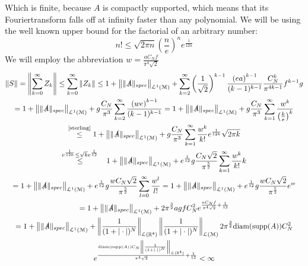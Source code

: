 \documentclass[b5paper,draft,openbib,12pt]{memoir}
\newcommand{\letext}[1]{\ensuremath{\stackrel{\text{#1}}{\le}}}
\begin{document}
Which is finite, because \(A\) is compactly supported, which means that its Fouriertransform falls off at infinity faster than any polynomial.
We will be using the well known upper bound for the factorial of an arbitrary number:
\begin{equation}\label{sterling}
n!\le \sqrt{2\pi n} \left(\frac{n}{e}\right)^n e^\frac{1}{12n}
\end{equation}
We will employ the abbreviation \(w= \frac{ a C_N f}{\pi^4\sqrt{2} }\)
\begin{multline}
\|S\|=\left\|\sum_{k=0}^\infty Z_k \right\|\le \sum_{k=0}^\infty \left\|Z_k \right\| \le 1+ \left\| \|\slashed{A}\|_{spec} \right\|_{\mathcal{L}^1(\mathcal{M})}+ \sum_{k=2}^\infty \left(\frac{1}{\sqrt{2} }\right)^{k-1} \frac{\left(e a\right)^{k-1}}{(k-1)^{k-1}} \frac{ C_N^k}{\pi^{4k-1}}  f^{k-1}  g\\
=1+ \left\| \|\slashed{A}\|_{spec} \right\|_{\mathcal{L}^1(\mathcal{M})}+g\frac{ C_N}{\pi^{3}} \sum_{k=2}^\infty \frac{\left(w e\right)^{k-1}}{(k-1)^{k-1}}
=1+ \left\| \|\slashed{A}\|_{spec} \right\|_{\mathcal{L}^1(\mathcal{M})}+g\frac{ C_N}{\pi^{3}} \sum_{k=1}^\infty \frac{w^{k}}{\left(\frac{k}{e}\right)^{k}}   \\
\letext{\eqref{sterling}}1+ \left\| \|\slashed{A}\|_{spec} \right\|_{\mathcal{L}^1(\mathcal{M})}+g\frac{ C_N}{\pi^{3}} \sum_{k=1}^\infty \frac{w^{k}}{k!} e^{\frac{1}{12k}} \sqrt{2\pi k} \\
\stackrel{e^{\frac{1}{12k}}\le \sqrt{k} e^{\frac{1}{12}}}{\le} \hspace{0.3cm} 1+ \left\| \|\slashed{A}\|_{spec} \right\|_{\mathcal{L}^1(\mathcal{M})}+e^{\frac{1}{12}} g\frac{ C_N\sqrt{2}}{\pi^{\frac{5}{2}}} \sum_{k=1}^\infty \frac{w^{k}}{k!}  k\\
=1+ \left\| \|\slashed{A}\|_{spec} \right\|_{\mathcal{L}^1(\mathcal{M})}+e^{\frac{1}{12}} g\frac{w C_N\sqrt{2}}{\pi^{\frac{5}{2}}} \sum_{l=0}^\infty \frac{w^{l}}{l!} 
=1+ \left\| \|\slashed{A}\|_{spec} \right\|_{\mathcal{L}^1(\mathcal{M})}+e^{\frac{1}{12}} g\frac{w C_N\sqrt{2}}{\pi^{\frac{5}{2}}} e^{w}\\
=1+ \left\| \|\slashed{A}\|_{spec} \right\|_{\mathcal{L}^1(\mathcal{M})}+ 2 \pi^{\frac{3}{2}}a g f  C^2_N e^{\frac{ a C_N f}{\pi^4\sqrt{2}}+\frac{1}{12}}\\
= 1+ \left\| \|\slashed{A}\|_{spec} \right\|_{\mathcal{L}^1(\mathcal{M})}+ \left\|\frac{1}{(1+|\cdot |)^N} \right\|_{\mathcal{L}(\mathbb{R}^4)} \left\|\frac{1}{(1+|\cdot |)^N} \right\|_{\mathcal{L}(\mathcal{M})} 2 \pi^{\frac{3}{2}}\text{diam}(\text{supp}(A))    C^2_N \\
 e^{\frac{ \text{diam}(\text{supp}(A)) C_N \left\|\frac{1}{(1+|\cdot |)^N} \right\|_{\mathcal{L}(\mathbb{R}^4)}}{\pi^4\sqrt{2}}+\frac{1}{12}} <\infty
\end{multline}
\end{document}
